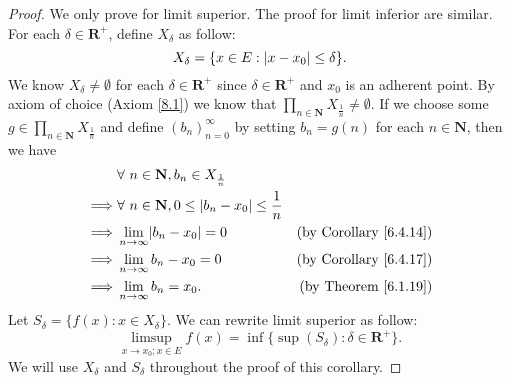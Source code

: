 \begin{proof}
    We only prove for limit superior.
    The proof for limit inferior are similar.
    For each \(\delta \in \mathbf{R}^+\), define \(X_{\delta}\) as follow:
    \[
        X_{\delta} = \{x \in E : \abs*{x - x_0} \leq \delta\}.
    \]
    We know \(X_{\delta} \neq \emptyset\) for each \(\delta \in \mathbf{R}^+\) since \(\delta \in \mathbf{R}^+\) and \(x_0\) is an adherent point.
    By axiom of choice (Axiom \ref{8.1}) we know that \(\prod_{n \in \mathbf{N}} X_{\frac{1}{n}} \neq \emptyset\).
    If we choose some \(g \in \prod_{n \in \mathbf{N}} X_{\frac{1}{n}}\) and define \((b_n)_{n = 0}^\infty\) by setting \(b_n = g(n)\) for each \(n \in \mathbf{N}\), then we have
    \begin{align*}
                 & \forall\ n \in \mathbf{N}, b_n \in X_{\frac{1}{n}}                                                       \\
        \implies & \forall\ n \in \mathbf{N}, 0 \leq \abs*{b_n - x_0} \leq \frac{1}{n}                                      \\
        \implies & \lim_{n \to \infty} \abs*{b_n - x_0} = 0                            & \text{(by Corollary \ref{6.4.14})} \\
        \implies & \lim_{n \to \infty} b_n - x_0 = 0                                   & \text{(by Corollary \ref{6.4.17})} \\
        \implies & \lim_{n \to \infty} b_n = x_0.                                      & \text{(by Theorem \ref{6.1.19})}
    \end{align*}
    Let \(S_{\delta} = \{f(x) : x \in X_{\delta}\}\).
    We can rewrite limit superior as follow:
    \[
        \limsup_{x \to x_0 ; x \in E} f(x) = \inf\{\sup(S_\delta) : \delta \in \mathbf{R}^+\}.
    \]
    We will use \(X_{\delta}\) and \(S_{\delta}\) throughout the proof of this corollary.


\end{proof}
